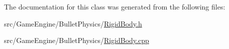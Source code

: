 The documentation for this class was generated from the following files\+:\begin{DoxyCompactItemize}
\item 
src/\+Game\+Engine/\+Bullet\+Physics/\hyperlink{_rigid_body_8h}{Rigid\+Body.\+h}\item 
src/\+Game\+Engine/\+Bullet\+Physics/\hyperlink{_rigid_body_8cpp}{Rigid\+Body.\+cpp}\end{DoxyCompactItemize}
